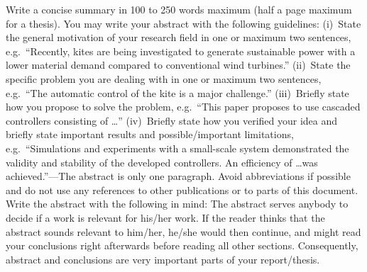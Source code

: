 \documentclass[journal]{IEEEtran}
\begin{document}
Write a concise summary in 100 to 250 words maximum (half a page maximum for a thesis). You may write your abstract with the following guidelines: (i)~State the general motivation of your research field in one or maximum two sentences, e.g.\ “Recently, kites are being investigated to generate sustainable power with a lower material demand compared to conventional wind turbines.” (ii)~State the specific problem you are dealing with in one or maximum two sentences, e.g.\ “The automatic control of the kite is a major challenge.” (iii)~Briefly state how you propose to solve the problem, e.g.\ “This paper proposes to use cascaded controllers consisting of \dots” (iv)~Briefly state how you verified your idea and briefly state important results and possible/important limitations, e.g.\ “Simulations and experiments with a small-scale system demonstrated the validity and stability of the developed controllers. An efficiency of \dots was achieved.”---The abstract is only one paragraph. Avoid abbreviations if possible and do not use any references to other publications or to parts of this document. Write the abstract with the following in mind: The abstract serves anybody to decide if a work is relevant for his/her work. If the reader thinks that the abstract sounds relevant to him/her, he/she would then continue, and might read your conclusions right afterwards before reading all other sections. Consequently, abstract and conclusions are very important parts of your report/thesis.

\end{document}
